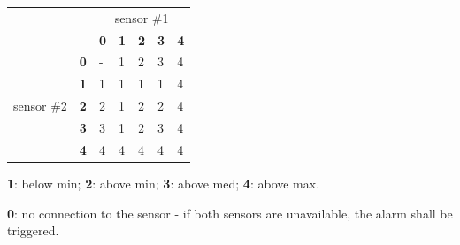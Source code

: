 \documentclass[11pt]{article}
\begin{document}
\begin{enumerate}[leftmargin=4em, font=\small, label=\textbf{SR-\arabic*}]
\begin{enumerate}[leftmargin=1.5em, font=\small, label=\textbf{.\arabic*:}]
\begin{table}[H]
\begin{tabular}{lllllll}
                                &                                 & \multicolumn{5}{c}{sensor \#1}                                                                                                                                          \\ \cline{3-7} 
                                & \multicolumn{1}{l|}{}           & \multicolumn{1}{l|}{\textbf{0}} & \multicolumn{1}{l|}{\textbf{1}} & \multicolumn{1}{l|}{\textbf{2}} & \multicolumn{1}{l|}{\textbf{3}} & \multicolumn{1}{l|}{\textbf{4}} \\ \cline{2-7} 
\multicolumn{1}{l|}{}           & \multicolumn{1}{l|}{\textbf{0}} & \multicolumn{1}{l|}{-}          & \multicolumn{1}{l|}{1}          & \multicolumn{1}{l|}{2}          & \multicolumn{1}{l|}{3}          & \multicolumn{1}{l|}{4}          \\ \cline{2-7} 
\multicolumn{1}{l|}{}           & \multicolumn{1}{l|}{\textbf{1}} & \multicolumn{1}{l|}{1}          & \multicolumn{1}{l|}{1}          & \multicolumn{1}{l|}{1}          & \multicolumn{1}{l|}{1}          & \multicolumn{1}{l|}{4}          \\ \cline{2-7} 
\multicolumn{1}{l|}{sensor \#2} & \multicolumn{1}{l|}{\textbf{2}} & \multicolumn{1}{l|}{2}          & \multicolumn{1}{l|}{1}          & \multicolumn{1}{l|}{2}          & \multicolumn{1}{l|}{2}          & \multicolumn{1}{l|}{4}          \\ \cline{2-7} 
\multicolumn{1}{l|}{}           & \multicolumn{1}{l|}{\textbf{3}} & \multicolumn{1}{l|}{3}          & \multicolumn{1}{l|}{1}          & \multicolumn{1}{l|}{2}          & \multicolumn{1}{l|}{3}          & \multicolumn{1}{l|}{4}          \\ \cline{2-7} 
\multicolumn{1}{l|}{}           & \multicolumn{1}{l|}{\textbf{4}} & \multicolumn{1}{l|}{4}          & \multicolumn{1}{l|}{4}          & \multicolumn{1}{l|}{4}          & \multicolumn{1}{l|}{4}          & \multicolumn{1}{l|}{4}          \\ \cline{2-7} 
\end{tabular}
\end{table}

\textbf{1}: below min; \textbf{2}: above min; \textbf{3}: above med; \textbf{4}: above max.

\textbf{0}: no connection to the sensor - if both sensors are unavailable, the alarm shall be triggered.
		\end{enumerate}
		

\end{enumerate}
\end{document}
